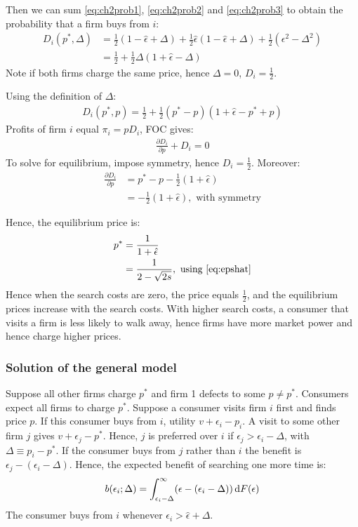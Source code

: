 Then we can sum \ref{eq:ch2prob1}, \ref{eq:ch2prob2} and
\ref{eq:ch2prob3} to obtain the probability that a firm buys from $i$:
\begin{align}
	D_i(p^*,\Delta) & =
	\frac{1}{2}(1-\hat\epsilon+\Delta)+
	\frac{1}{2}\hat\epsilon(1-\hat\epsilon+\Delta)+
	\frac{1}{2}(\epsilon^2-\Delta^2)                                         \\
	                & = \frac{1}{2}+\frac{1}{2}\Delta(1+\hat\epsilon-\Delta)
\end{align}
Note if both firms charge the same price, hence $\Delta=0$,
$D_i=\frac{1}{2}$.

Using the definition of $\Delta$:
\begin{align}
	D_i(p^*,p)=\frac{1}{2}+\frac{1}{2}(p^*-p)(1+\hat\epsilon-p^*+p)
\end{align}
Profits of firm $i$ equal $\pi_i=pD_i$, FOC gives:
\begin{align}
	\frac{\partial D_i}{\partial p}+D_i=0
\end{align}
To solve for equilibrium, impose symmetry, hence $D_i=\frac{1}{2}$.
Moreover:
\begin{align}
	\frac{\partial D_i}{\partial p} & =p^*-p-\frac{1}{2}(1+\hat\epsilon)                  \\
	                                & =-\frac{1}{2}(1+\hat\epsilon),\text{ with symmetry}
\end{align}

Hence, the equilibrium price is:
\begin{align}
	p^* & =\frac{1}{1+\hat\epsilon}                            \\
	    & =\frac{1}{2-\sqrt{2s}},\text{ using \ref{eq:epshat}}
\end{align}
Hence when the search costs are zero, the price equals $\frac{1}{2}$,
and the equilibrium prices increase with the search costs. With higher search
costs, a consumer that visits a firm is less likely to walk away, hence
firms have more market power and hence charge higher prices.
\subsubsection{Solution of the general model}
Suppose all other firms charge $p^*$ and firm 1 defects to some
$p\neq p^*$. Consumers expect all firms to charge $p^*$. Suppose a
consumer visits firm $i$ first and finds price $p$. If this consumer buys
from $i$, utility $v+\epsilon_i-p_i$. A visit to some other firm $j$ gives
$v+\epsilon_j-p^*$. Hence, $j$ is preferred over $i$ if
$\epsilon_j>\epsilon_i-\Delta$, with $\Delta\equiv p_i-p^*$. If the
consumer buys from $j$ rather than $i$ the benefit is
$\epsilon_j-(\epsilon_i-\Delta)$. Hence, the expected benefit of
searching one more time is:
\begin{align}
	b(\epsilon_i;\Delta)=\int_{\epsilon_i-\Delta}^\infty(\epsilon-(\epsilon_i-\Delta))\,\textrm{d}F(\epsilon)
\end{align}
The consumer buys from $i$ whenever $\epsilon_i>\hat\epsilon+\Delta$.

